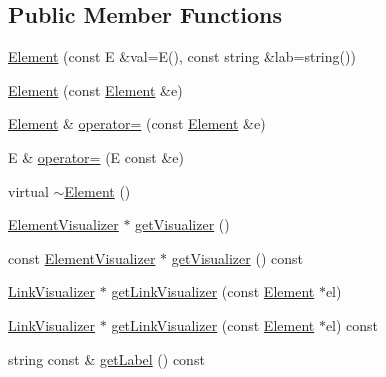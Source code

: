 \subsection*{Public Member Functions}
\begin{DoxyCompactItemize}
\item 
\hyperlink{classbridges_1_1datastructure_1_1_element_a21820b1d88f2eb25adfe768bd03046d6}{Element} (const E \&val=E(), const string \&lab=string())
\item 
\hyperlink{classbridges_1_1datastructure_1_1_element_a80eb6ac6925c4974c2e88e7e1446e231}{Element} (const \hyperlink{classbridges_1_1datastructure_1_1_element}{Element} \&e)
\item 
\hyperlink{classbridges_1_1datastructure_1_1_element}{Element} \& \hyperlink{classbridges_1_1datastructure_1_1_element_a6446ad27ba42a854ff93b74b4d7eb3cb}{operator=} (const \hyperlink{classbridges_1_1datastructure_1_1_element}{Element} \&e)
\item 
E \& \hyperlink{classbridges_1_1datastructure_1_1_element_a18ffc753328275e95bb1ee967f88a00a}{operator=} (E const \&e)
\item 
virtual \hyperlink{classbridges_1_1datastructure_1_1_element_ad7ed60da8ed4a31b7a2678d0aa5db205}{$\sim$\+Element} ()
\item 
\hyperlink{classbridges_1_1datastructure_1_1_element_visualizer}{Element\+Visualizer} $\ast$ \hyperlink{classbridges_1_1datastructure_1_1_element_ad4f9ca479938bacd4586df8e7ede2116}{get\+Visualizer} ()
\item 
const \hyperlink{classbridges_1_1datastructure_1_1_element_visualizer}{Element\+Visualizer} $\ast$ \hyperlink{classbridges_1_1datastructure_1_1_element_a75a7770c3b6b1a6cd826293ea33d2d0a}{get\+Visualizer} () const
\item 
\hyperlink{classbridges_1_1datastructure_1_1_link_visualizer}{Link\+Visualizer} $\ast$ \hyperlink{classbridges_1_1datastructure_1_1_element_a531bde8ec32ef31b6d88af37cb029d86}{get\+Link\+Visualizer} (const \hyperlink{classbridges_1_1datastructure_1_1_element}{Element} $\ast$el)
\item 
\hyperlink{classbridges_1_1datastructure_1_1_link_visualizer}{Link\+Visualizer} $\ast$ \hyperlink{classbridges_1_1datastructure_1_1_element_a5e3b55d5098d72d4a83b68a60584a3a1}{get\+Link\+Visualizer} (const \hyperlink{classbridges_1_1datastructure_1_1_element}{Element} $\ast$el) const
\item 
string const  \& \hyperlink{classbridges_1_1datastructure_1_1_element_a44949edf79379a4d48490e98c15992a6}{get\+Label} () const

\end{DoxyCompactItemize}

